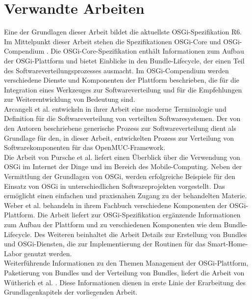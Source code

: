 \section{Verwandte Arbeiten}

Eine der Grundlagen dieser Arbeit bildet die aktuellste \ac{OSGi}-Spezifikation R6.
Im Mittelpunkt dieser Arbeit stehen die Spezifikationen \ac{OSGi}-Core \cite{osgi_r6} und \ac{OSGi}-Compendium \cite{osgi_r6_compendium}. %
Die \ac{OSGi}-Core-Spezifikation enthält Informationen zum Aufbau der \ac{OSGi}-Plattform und bietet Einblicke in den Bundle-Lifecycle, der einen Teil des Softwareverteilungsprozesses ausmacht.
Im \ac{OSGi}-Compendium werden verschiedene Dienste und Komponenten der Plattform beschrieben,
die für die Integration eines Werkzeuges zur Softwareverteilung und für die Empfehlungen zur Weiterentwicklung von Bedeutung sind.\\

Arcangeli et al. \cite{sw_dist} entwickeln in ihrer Arbeit eine moderne Terminologie und Definition für die Softwareverteilung von verteilten Softwaresystemen.
Der von den Autoren beschriebene generische Prozess zur Softwareverteilung dient als Grundlage für den, in dieser Arbeit, entwickelten Prozess 
zur Verteilung von Softwarekomponenten für das OpenMUC-Framework.\\

Die Arbeit von Pursche et al. \cite{osgi_iot_und_mobile} liefert einen Überblick über die Verwendung von \ac{OSGi} im Internet der Dinge und im Bereich des Mobile-Computing.
Neben der Vermittlung der Grundlagen von \ac{OSGi}, werden erfolgreiche Beispiele für den Einsatz von \ac{OSGi} in unterschiedlichen Softwareprojekten vorgestellt.
Das ermöglicht einen einfachen und praxisnahen Zugang zu der behandelten Materie.\\

Weber et al. \cite{osgi_praktiker} behandeln in ihrem Fachbuch verschiedene Komponenten der \ac{OSGi}-Plattform.
Die Arbeit liefert zur \ac{OSGi}-Spezifikation ergänzende Informationen zum Aufbau der Plattform und zu verschiedenen Komponenten wie dem Bundle-Lifecycle.
Des Weiteren beinhaltet die Arbeit Details zur Erstellung von Bundles und \ac{OSGi}-Diensten, die zur Implementierung der Routinen für das Smart-Home-Labor genutzt werden.\\

Weiterführende Informationen zu den Themen Management der \ac{OSGi}-Plattform, Paketierung von Bundles und der Verteilung von Bundles, liefert die Arbeit von Wütherich et al. \cite{osgi_service_platform}.
Diese Informationen dienen in erste Linie der Erarbeitung des Grundlagenkapitels der vorliegenden Arbeit.\\

